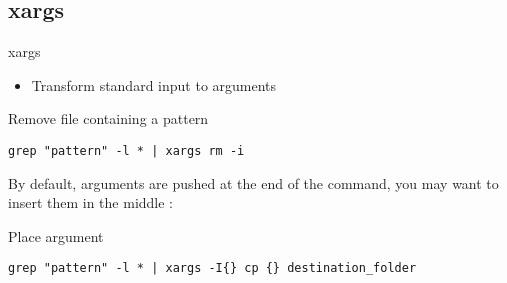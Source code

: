 \subsection{xargs}

\begin{frame}[fragile]{xargs}
  \begin{itemize}
    \pause \item Transform standard input to arguments
  \end{itemize}
  \pause

  \begin{exampleblock}{Remove file containing a pattern}
    \begin{lstlisting}[showstringspaces=false,basicstyle=\tiny]
grep "pattern" -l * | xargs rm -i
    \end{lstlisting}
  \end{exampleblock}
\pause
By default, arguments are pushed at the end of the command, you may want to insert them in the middle :
\pause

  \begin{exampleblock}{Place argument}
    \begin{lstlisting}[showstringspaces=false,basicstyle=\tiny]
grep "pattern" -l * | xargs -I{} cp {} destination_folder
    \end{lstlisting}
  \end{exampleblock}
\end{frame}

